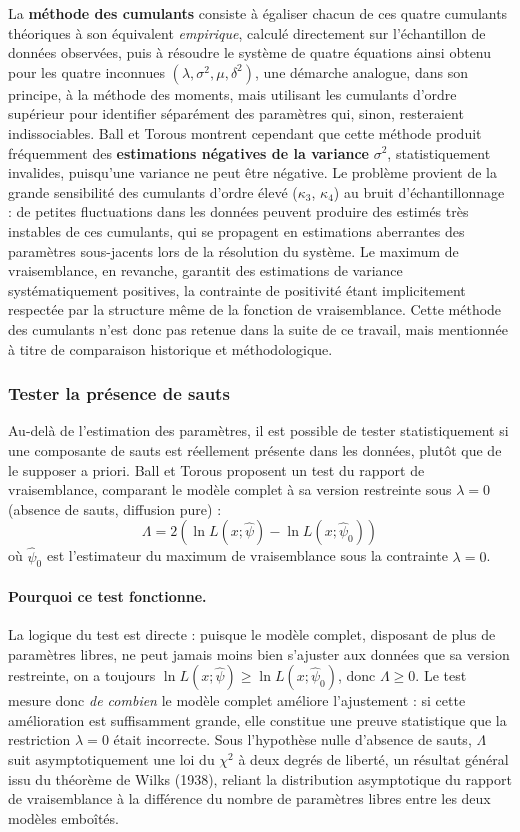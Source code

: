 \documentclass{article}
\begin{document}
La \textbf{méthode des cumulants} consiste à égaliser chacun de ces quatre cumulants théoriques à son équivalent \emph{empirique}, calculé directement sur l'échantillon de données observées, puis à résoudre le système de quatre équations ainsi obtenu pour les quatre inconnues $(\lambda,\sigma^2,\mu,\delta^2)$, une démarche analogue, dans son principe, à la méthode des moments, mais utilisant les cumulants d'ordre supérieur pour identifier séparément des paramètres qui, sinon, resteraient indissociables.
Ball et Torous montrent cependant que cette méthode produit fréquemment des \textbf{estimations négatives de la variance} $\sigma^2$, statistiquement invalides, puisqu'une variance ne peut être négative. Le problème provient de la grande sensibilité des cumulants d'ordre élevé ($\kappa_3$, $\kappa_4$) au bruit d'échantillonnage : de petites fluctuations dans les données peuvent produire des estimés très instables de ces cumulants, qui se propagent en estimations aberrantes des paramètres sous-jacents lors de la résolution du système. Le maximum de vraisemblance, en revanche, garantit des estimations de variance systématiquement positives, la contrainte de positivité étant implicitement respectée par la structure même de la fonction de vraisemblance. Cette méthode des cumulants n'est donc pas retenue dans la suite de ce travail, mais mentionnée à titre de comparaison historique et méthodologique.
\subsubsection*{Tester la présence de sauts}
Au-delà de l'estimation des paramètres, il est possible de tester statistiquement si une composante de sauts est réellement présente dans les données, plutôt que de le supposer a priori. Ball et Torous proposent un test du rapport de vraisemblance, comparant le modèle complet à sa version restreinte sous $\lambda=0$ (absence de sauts, diffusion pure) :
\begin{equation}
\Lambda = 2\left(\ln L(x;\hat{\psi}) - \ln L(x;\hat{\psi}_0)\right)
\end{equation}
où $\hat{\psi}_0$ est l'estimateur du maximum de vraisemblance sous la contrainte $\lambda=0$. 
\paragraph{Pourquoi ce test fonctionne.} La logique du test est directe : puisque le modèle complet, disposant de plus de paramètres libres, ne peut jamais moins bien s'ajuster aux données que sa version restreinte, on a toujours $\ln L(x;\hat{\psi}) \geq \ln L(x;\hat{\psi}_0)$, donc $\Lambda\geq 0$. Le test mesure donc \emph{de combien} le modèle complet améliore l'ajustement : si cette amélioration est suffisamment grande, elle constitue une preuve statistique que la restriction $\lambda=0$ était incorrecte.
Sous l'hypothèse nulle d'absence de sauts, $\Lambda$ suit asymptotiquement une loi du $\chi^2$ à deux degrés de liberté, un résultat général issu du théorème de Wilks (1938), reliant la distribution asymptotique du rapport de vraisemblance à la différence du nombre de paramètres libres entre les deux modèles emboîtés.
\end{document}
